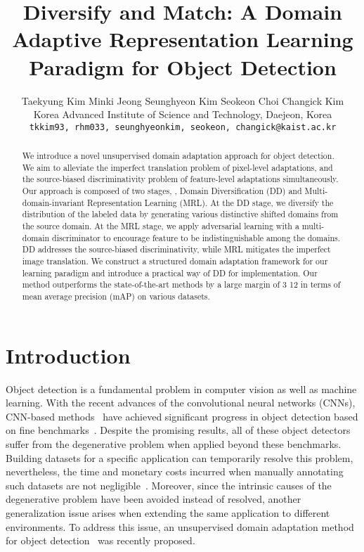 \documentclass[10pt,twocolumn,letterpaper]{article}
\begin{document}
\title{Diversify and Match: A Domain Adaptive Representation Learning Paradigm for Object Detection}

\author{Taekyung Kim \quad Minki Jeong \quad Seunghyeon Kim \quad Seokeon Choi \quad Changick Kim\\
Korea Advanced Institute of Science and Technology, Daejeon, Korea\\
{\tt\small tkkim93, rhm033, seunghyeonkim, seokeon, changick@kaist.ac.kr}
}

\maketitle



\begin{abstract}
   We introduce a novel unsupervised domain adaptation approach for object detection.
   We aim to alleviate the imperfect translation problem of pixel-level adaptations, and the source-biased discriminativity problem of feature-level adaptations simultaneously.
   Our approach is composed of two stages, \ie, Domain Diversification (DD) and Multi-domain-invariant Representation Learning (MRL).
   At the DD stage, we diversify the distribution of the labeled data by generating various distinctive shifted domains from the source domain.
   At the MRL stage, we apply adversarial learning with a multi-domain discriminator to encourage feature to be indistinguishable among the domains.
   DD addresses the source-biased discriminativity, while MRL mitigates the imperfect image translation.
   We construct a structured domain adaptation framework for our learning paradigm and introduce a practical way of DD for implementation.
   Our method outperforms the state-of-the-art methods by a large margin of 3  12 in terms of mean average precision (mAP) on various datasets.
\end{abstract}



\section{Introduction}
Object detection is a fundamental problem in computer vision as well as machine learning.
With the recent advances of the convolutional neural networks (CNNs), CNN-based methods~\cite{RCNN,FASTR-CNN,FasterR-CNN, SSD, YOLO, RetinaNet,R-FCN,RefineDet,RFBNet} have achieved significant progress in object detection based on fine benchmarks~\cite{PascalVoc,MSCOCO,openimages}. 
Despite the promising results, all of these object detectors suffer from the degenerative problem when applied beyond these benchmarks.
Building datasets for a specific application can temporarily resolve this problem, nevertheless, the time and monetary costs incurred when manually annotating such datasets are not negligible~\cite{LabelingIssHard1, LabelingIssHard2}.
Moreover, since the intrinsic causes of the degenerative problem have been avoided instead of resolved, another generalization issue arises when extending the same application to different environments.
To address this issue, an unsupervised domain adaptation method for object detection~\cite{DAFRCNN} was recently proposed.
\end{document}
